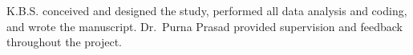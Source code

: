 \documentclass[10pt, twocolumn]{article}
\begin{document}
K.B.S. conceived and designed the study, performed all data analysis and coding, and wrote
the manuscript. Dr.~Purna Prasad provided supervision and feedback throughout the project.

\FloatBarrier
\clearpage

\printbibliography[title={References}]
\end{document}
